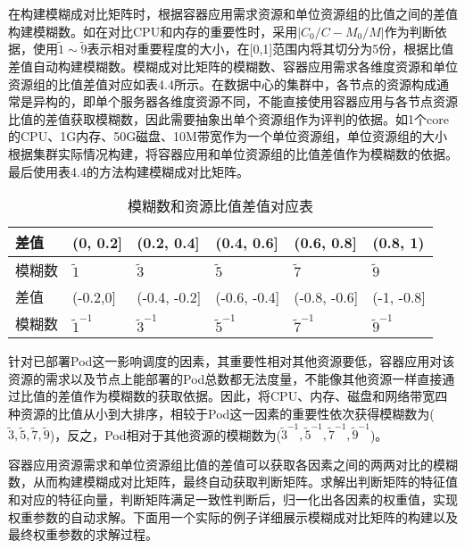 在构建模糊成对比矩阵时，根据容器应用需求资源和单位资源组的比值之间的差值构建模糊数。如在对比CPU和内存的重要性时，采用$|C_{0}/C-M_{0}/M|$作为判断依据，使用$\widetilde{1}\sim\widetilde{9}$表示相对重要程度的大小，在[0,1]范围内将其切分为5份，根据比值差值自动构建模糊数。模糊成对比矩阵的模糊数、容器应用需求各维度资源和单位资源组的比值差值对应如表4.4所示。在数据中心的集群中，各节点的资源构成通常是异构的，即单个服务器各维度资源不同，不能直接使用容器应用与各节点资源比值的差值获取模糊数，因此需要抽象出单个资源组作为评判的依据。如1个core的CPU、1G内存、50G磁盘、10M带宽作为一个单位资源组，单位资源组的大小根据集群实际情况构建，将容器应用和单位资源组的比值差值作为模糊数的依据。最后使用表4.4的方法构建模糊成对比矩阵。
\begin{table}[htbp]
	\centering\dawu[1.3]
	\caption{模糊数和资源比值差值对应表}
	\begin{tabular}{|p{1.8cm}<{\centering}|p{1.8cm}<{\centering}|p{1.8cm}<{\centering}|p{1.8cm}<{\centering}|p{1.8cm}<{\centering}|p{1.8cm}<{\centering}|} \hline
		差值 & (0, 0.2] & (0.2, 0.4] & (0.4, 0.6] & (0.6, 0.8] & (0.8, 1) \\ \hline
		模糊数 & $\widetilde{1}$ & $\widetilde{3}$ & $\widetilde{5}$ & $\widetilde{7}$  & $\widetilde{9}$  \\ \hline
		差值 & (-0.2,0] & (-0.4, -0.2] & (-0.6, -0.4] & (-0.8, -0.6] & (-1, -0.8]  \\ \hline
		模糊数 & $\widetilde{1}^{-1}$ & $\widetilde{3}^{-1}$ & $\widetilde{5}^{-1}$ & $\widetilde{7}^{-1}$ & $\widetilde{9}^{-1}$  \\ \hline
	\end{tabular}
\end{table}

针对已部署Pod这一影响调度的因素，其重要性相对其他资源要低，容器应用对该资源的需求以及节点上能部署的Pod总数都无法度量，不能像其他资源一样直接通过比值的差值作为模糊数的获取依据。因此，将CPU、内存、磁盘和网络带宽四种资源的比值从小到大排序，相较于Pod这一因素的重要性依次获得模糊数为(${\widetilde{3},\widetilde{5},\widetilde{7},\widetilde{9}}$)，反之，Pod相对于其他资源的模糊数为(${\widetilde{3}^{-1},\widetilde{5}^{-1},\widetilde{7}^{-1},\widetilde{9}^{-1}}$)。

容器应用资源需求和单位资源组比值的差值可以获取各因素之间的两两对比的模糊数，从而构建模糊成对比矩阵，最终自动获取判断矩阵。求解出判断矩阵的特征值和对应的特征向量，判断矩阵满足一致性判断后，归一化出各因素的权重值，实现权重参数的自动求解。下面用一个实际的例子详细展示模糊成对比矩阵的构建以及最终权重参数的求解过程。

